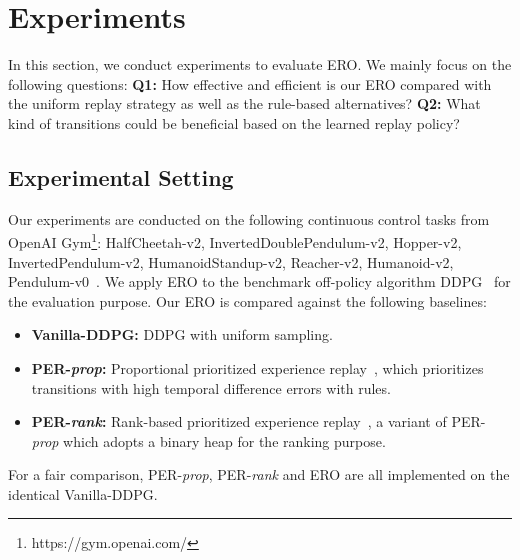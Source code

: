 \documentclass{article}
\begin{document}
\section{Experiments}
\label{label:sec_exp}
In this section, we conduct experiments to evaluate ERO. We mainly focus on the following questions: \textbf{Q1:} How effective and efficient is our ERO compared with the uniform replay strategy as well as the rule-based alternatives? \textbf{Q2:} What kind of transitions could be beneficial based on the learned replay policy?
\subsection{Experimental Setting}

Our experiments are conducted on the following continuous control tasks from OpenAI Gym\footnote{https://gym.openai.com/}: HalfCheetah-v2, InvertedDoublePendulum-v2, Hopper-v2, InvertedPendulum-v2, HumanoidStandup-v2, Reacher-v2, Humanoid-v2, Pendulum-v0~\cite{todorov2012mujoco,brockman2016openai}. We apply ERO to the benchmark off-policy algorithm DDPG~\cite{lillicrap2016continuous} for the evaluation purpose. Our ERO is compared against the following baselines:
\begin{itemize}
    \item \textbf{Vanilla-DDPG:} DDPG with uniform sampling.
    \item \textbf{PER-\emph{prop}:} Proportional prioritized experience replay~\cite{schaul2016prioritized}, which prioritizes transitions with high temporal difference errors with rules.
    \item \textbf{PER-\emph{rank}:} Rank-based prioritized experience replay~\cite{schaul2016prioritized}, a variant of PER-\emph{prop} which adopts a binary heap for the ranking purpose.
\end{itemize}
For a fair comparison, PER-\emph{prop}, PER-\emph{rank} and ERO are all implemented on the identical Vanilla-DDPG.
\end{document}
